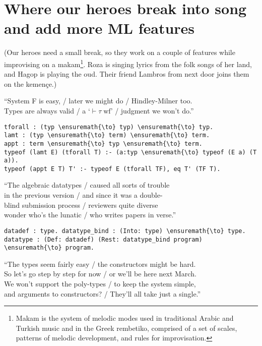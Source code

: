 \section{Where our heroes break into song and add more ML
features}\label{where-our-heroes-break-into-song-and-add-more-ml-features}

\begin{scenecomment}
(Our heroes need a small break, so they work on a couple of features while improvising on a makam\footnote{Makam is the system of melodic modes used in traditional Arabic and Turkish music and in the Greek rembetiko, comprised of a set of scales, patterns of melodic development, and rules for improvisation.}. Roza is singing lyrics from the folk songs of her land, and Hagop is playing the oud. Their friend Lambros from next door joins them on the kemen\c{c}e.)
\end{scenecomment}

\begin{versy}
``System F is easy, / later we might do / Hindley-Milner too. \\
Types are always valid / a `$\vdash \tau \; \text{wf}$' / judgment we won't do.''
\end{versy}

\begin{verbatim}
tforall : (typ \ensuremath{\to} typ) \ensuremath{\to} typ.
lamt : (typ \ensuremath{\to} term) \ensuremath{\to} term.
appt : term \ensuremath{\to} typ \ensuremath{\to} term.
typeof (lamt E) (tforall T) :- (a:typ \ensuremath{\to} typeof (E a) (T a)).
typeof (appt E T) T' :- typeof E (tforall TF), eq T' (TF T).
\end{verbatim}

\begin{versy}
``The algebraic datatypes / caused all sorts of trouble \\
in the previous version / and since it was a double- \\
blind submission process / reviewers quite diverse \\
wonder who's the lunatic / who writes papers in verse.''
\end{versy}

\begin{verbatim}
datadef : type. datatype_bind : (Into: type) \ensuremath{\to} type.
datatype : (Def: datadef) (Rest: datatype_bind program) \ensuremath{\to} program.
\end{verbatim}

\begin{versy}
``The types seem fairly easy / the constructors might be hard. \\
So let's go step by step for now / or we'll be here next March. \\
We won't support the poly-types / to keep the system simple, \\
and arguments to constructors? / They'll all take just a single.''
\end{versy}

